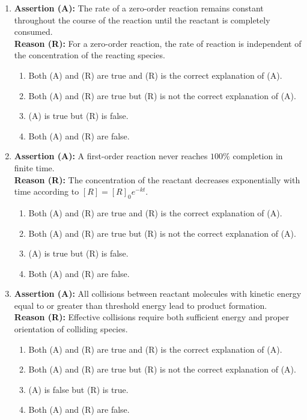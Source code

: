 \documentclass[11pt, a4paper]{article}
\begin{document}
\begin{enumerate}
\item \textbf{Assertion (A):} The rate of a zero-order reaction remains constant throughout the course of the reaction until the reactant is completely consumed. \\
\textbf{Reason (R):} For a zero-order reaction, the rate of reaction is independent of the concentration of the reacting species.
\begin{enumerate}
    \item Both (A) and (R) are true and (R) is the correct explanation of (A).
    \item Both (A) and (R) are true but (R) is not the correct explanation of (A).
    \item (A) is true but (R) is false.
    \item Both (A) and (R) are false.
\end{enumerate}

\item \textbf{Assertion (A):} A first-order reaction never reaches $100\%$ completion in finite time. \\
\textbf{Reason (R):} The concentration of the reactant decreases exponentially with time according to $[R] = [R]_0 e^{-kt}$.
\begin{enumerate}
    \item Both (A) and (R) are true and (R) is the correct explanation of (A).
    \item Both (A) and (R) are true but (R) is not the correct explanation of (A).
    \item (A) is true but (R) is false.
    \item Both (A) and (R) are false.
\end{enumerate}

\item \textbf{Assertion (A):} All collisions between reactant molecules with kinetic energy equal to or greater than threshold energy lead to product formation. \\
\textbf{Reason (R):} Effective collisions require both sufficient energy and proper orientation of colliding species.
\begin{enumerate}
    \item Both (A) and (R) are true and (R) is the correct explanation of (A).
    \item Both (A) and (R) are true but (R) is not the correct explanation of (A).
    \item (A) is false but (R) is true.
    \item Both (A) and (R) are false.
\end{enumerate}


\end{enumerate}
\end{document}

